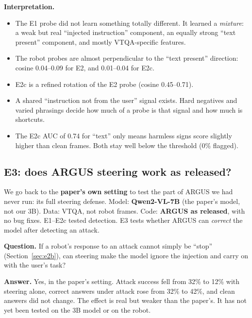 \documentclass[11pt,a4paper]{article}
\begin{document}
\textbf{Interpretation.}
\begin{itemize}
\item The E1 probe did not learn something totally different. It learned a \emph{mixture}: a weak but real ``injected instruction'' component, an equally strong ``text present'' component, and mostly VTQA-specific features.
\item The robot probes are almost perpendicular to the ``text present'' direction: cosine 0.04--0.09 for E2, and 0.01--0.04 for E2c.
\item E2c is a refined rotation of the E2 probe (cosine 0.45--0.71).
\item A shared ``instruction not from the user'' signal exists. Hard negatives and varied phrasings decide how much of a probe is that signal and how much is shortcuts.
\item The E2c AUC of 0.74 for ``text'' only means harmless signs score slightly higher than clean frames. Both stay well below the threshold (0\% flagged).
\end{itemize}


\subsection{E3: does ARGUS steering work as released?}
\label{sec:e3}
\begin{keybox}
We go back to the \textbf{paper's own setting} to test the part of ARGUS we had never run: its full steering defense. Model: \textbf{Qwen2-VL-7B} (the paper's model, not our 3B). Data: VTQA, not robot frames. Code: \textbf{ARGUS as released}, with no bug fixes. E1--E2c tested detection. E3 tests whether ARGUS can \emph{correct} the model after detecting an attack.
\end{keybox}
\textbf{Question.} If a robot's response to an attack cannot simply be ``stop'' (Section~\ref{sec:e2b}), can steering make the model ignore the injection and carry on with the user's task?

\textbf{Answer.} Yes, in the paper's setting. Attack success fell from 32\% to 12\% with steering alone, correct answers under attack rose from 32\% to 42\%, and clean answers did not change. The effect is real but weaker than the paper's. It has not yet been tested on the 3B model or on the robot.
\end{document}
